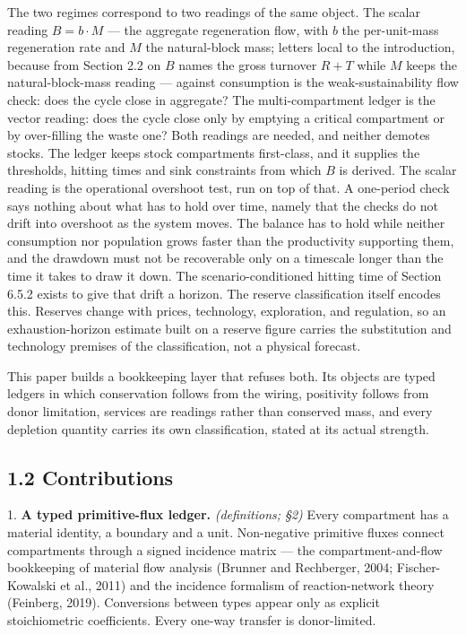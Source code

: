 \documentclass[11pt]{article}
\begin{document}
The two regimes correspond to two readings of the same object. The scalar reading \(B = b\cdot M\) --- the aggregate regeneration flow, with \(b\) the per-unit-mass regeneration rate and \(M\) the natural-block mass; letters local to the introduction, because from Section 2.2 on \(B\) names the gross turnover \(R + T\) while \(M\) keeps the natural-block-mass reading --- against consumption is the weak-sustainability flow check: does the cycle close in aggregate? The multi-compartment ledger is the vector reading: does the cycle close only by emptying a critical compartment or by over-filling the waste one? Both readings are needed, and neither demotes stocks. The ledger keeps stock compartments first-class, and it supplies the thresholds, hitting times and sink constraints from which \(B\) is derived. The scalar reading is the operational overshoot test, run on top of that. A one-period check says nothing about what has to hold over time, namely that the checks do not drift into overshoot as the system moves. The balance has to hold while neither consumption nor population grows faster than the productivity supporting them, and the drawdown must not be recoverable only on a timescale longer than the time it takes to draw it down. The scenario-conditioned hitting time of Section 6.5.2 exists to give that drift a horizon. The reserve classification itself encodes this. Reserves change with prices, technology, exploration, and regulation, so an exhaustion-horizon estimate built on a reserve figure carries the substitution and technology premises of the classification, not a physical forecast.

This paper builds a bookkeeping layer that refuses both. Its objects are typed ledgers in which conservation follows from the wiring, positivity follows from donor limitation, services are readings rather than conserved mass, and every depletion quantity carries its own classification, stated at its actual strength.

\subsection*{1.2 Contributions}\label{12-contributions}

1. \textbf{A typed primitive-flux ledger.} \emph{(definitions; \S2)} Every compartment has a material identity, a boundary and a unit. Non-negative primitive fluxes connect compartments through a signed incidence matrix --- the compartment-and-flow bookkeeping of material flow analysis (Brunner and Rechberger, 2004; Fischer-Kowalski et al., 2011) and the incidence formalism of reaction-network theory (Feinberg, 2019). Conversions between types appear only as explicit stoichiometric coefficients. Every one-way transfer is donor-limited.
\end{document}
